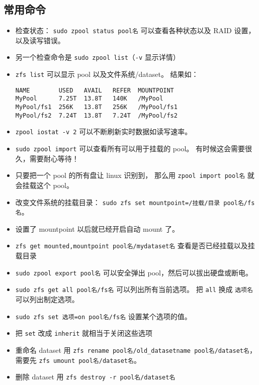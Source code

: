 \subsection{常用命令}
\begin{itemize}
\item 检查状态： \verb|sudo zpool status pool名| 可以查看各种状态以及 RAID 设置， 以及读写错误。
\item 另一个检查命令是 \verb|sudo zpool list|（\verb|-v| 显示详情）
\item \verb`zfs list` 可以显示 pool 以及文件系统/dataset。 结果如：
\begin{lstlisting}[language=none]
NAME        USED   AVAIL   REFER  MOUNTPOINT
MyPool      7.25T  13.8T   140K   /MyPool
MyPool/fs1  256K   13.8T   256K   /MyPool/fs1
MyPool/fs2  7.24T  13.8T   7.24T  /MyPool/fs2
\end{lstlisting}
\item \verb|zpool iostat -v 2| 可以不断刷新实时数据如读写速率。
\item \verb|sudo zpool import| 可以查看所有可以用于挂载的 pool。 有时候这会需要很久，需要耐心等待！
\item 只要把一个 pool 的所有盘让 linux 识别到， 那么用 \verb|zpool import pool名| 就会挂载这个 pool。
\item 改变文件系统的挂载目录： \verb|sudo zfs set mountpoint=/挂载/目录 pool名/fs名|。
\item 设置了 mountpoint 以后就已经开启自动 mount 了。
\item \verb`zfs get mounted,mountpoint pool名/mydataset名` 查看是否已经挂载以及挂载目录
\item \verb|sudo zpool export pool名| 可以安全弹出 pool，然后可以拔出硬盘或断电。
\item \verb|sudo zfs get all pool名/fs名| 可以列出所有当前选项。 把 \verb|all| 换成 \verb|选项名| 可以列出制定选项。
\item \verb|sudo zfs set 选项=on pool名/fs名| 设置某个选项的值。
\item 把 \verb|set| 改成 \verb|inherit| 就相当于关闭这些选项
\item 重命名 dataset 用 \verb`zfs rename pool名/old_datasetname pool名/dataset名`， 需要先 \verb`zfs umount pool名/dataset名`。
\item 删除 dataset 用 \verb`zfs destroy -r pool名/dataset名`
\end{itemize}


